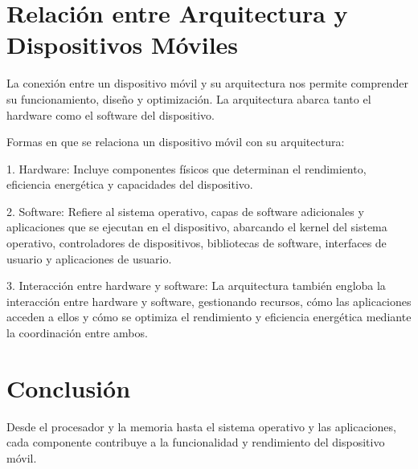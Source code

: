 \documentclass{article}
\begin{document}
	\section{Relación entre Arquitectura y Dispositivos Móviles}
	La conexión entre un dispositivo móvil y su arquitectura nos permite comprender su funcionamiento, diseño y optimización. La arquitectura abarca tanto el hardware como el software del dispositivo.
	
	Formas en que se relaciona un dispositivo móvil con su arquitectura:
	
	1. Hardware: Incluye componentes físicos que determinan el rendimiento, eficiencia energética y capacidades del dispositivo.
	
	2. Software: Refiere al sistema operativo, capas de software adicionales y aplicaciones que se ejecutan en el dispositivo, abarcando el kernel del sistema operativo, controladores de dispositivos, bibliotecas de software, interfaces de usuario y aplicaciones de usuario.
	
	3. Interacción entre hardware y software: La arquitectura también engloba la interacción entre hardware y software, gestionando recursos, cómo las aplicaciones acceden a ellos y cómo se optimiza el rendimiento y eficiencia energética mediante la coordinación entre ambos.
	
	\section{Conclusión}
	Desde el procesador y la memoria hasta el sistema operativo y las aplicaciones, cada componente contribuye a la funcionalidad y rendimiento del dispositivo móvil.
	
\end{document}
